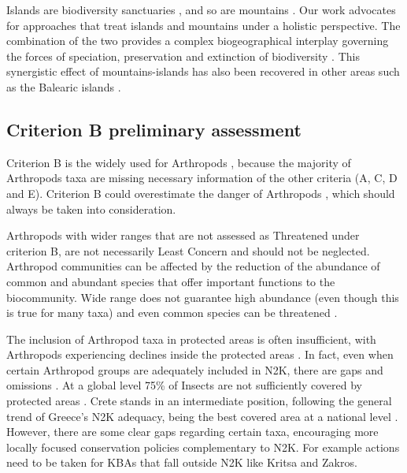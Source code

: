Islands are biodiversity sanctuaries \parencite{whittaker2007island}, and
so are mountains \parencite{rahbek2019humboldts}. Our work advocates for approaches that
treat islands and mountains under a holistic perspective. The combination of
the two provides a complex biogeographical interplay governing the forces of
speciation, preservation and extinction of biodiversity \parencite{steinbauer2016topography-driven}.
This synergistic effect of mountains-islands has also been recovered in other
areas such as the Balearic islands \parencite{guardiola2023are-mediterranean}.

    \subsection{Criterion B preliminary assessment}
    \label{subsec:arthropods-species-assessment-disc}

Criterion B is the widely used for Arthropods \parencite{cardoso2011adapting,carpaneto2015a-red-list},
because the majority of Arthropods taxa are missing necessary information of the other criteria (A, C, D and E).
Criterion B could overestimate the danger of Arthropods \parencite{cardoso2011adapting},
which should always be taken into consideration.

Arthropods with wider ranges that are not assessed as Threatened under
criterion B, are not necessarily Least Concern and should not be neglected.
Arthropod communities can be affected by the reduction of the abundance of
common and abundant species that offer important functions to the biocommunity.
Wide range does not guarantee high abundance (even though this is true for many
taxa) and even common species can be threatened \parencite{habel2018vanishing,klink2023disproportionate}.

The inclusion of Arthropod taxa in protected areas is often insufficient, with
Arthropods experiencing declines inside the protected areas \parencite{borges2005ranking,chowdhury2023protected,harry2019protected,rada2019protected}.
In fact, even when certain Arthropod groups are adequately included in N2K,
there are gaps and omissions \parencite{sanchez-fernandez2008are-the-endemic,verovnik2011is-the-natura}.
At a global level 75\% of Insects are not sufficiently covered by protected
areas \parencite{chowdhury2023three-quarters}. Crete stands in an intermediate position,
following the general trend of Greece’s N2K adequacy, being the best covered
area at a national level \parencite{kougioumoutzis2021plant,spiliopoulou2021the-natura}.
However, there are some clear gaps regarding certain taxa, encouraging more
locally focused conservation policies complementary to N2K. For example actions
need to be taken for KBAs that fall outside N2K like Kritsa and Zakros.

